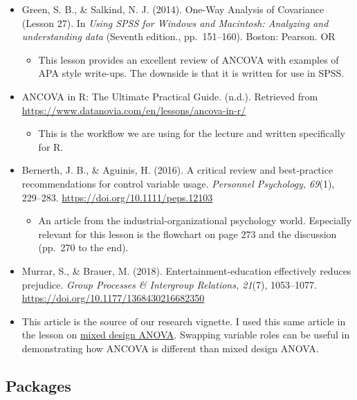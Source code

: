 \documentclass[
  11pt,
]{book}
\providecommand{\tightlist}{%
  \setlength{\itemsep}{0pt}\setlength{\parskip}{0pt}}
\begin{document}
\begin{itemize}
\tightlist
\item
  Green, S. B., \& Salkind, N. J. (2014). One-Way Analysis of Covariance (Lesson 27). In \emph{Using SPSS for Windows and Macintosh: Analyzing and understanding data} (Seventh edition., pp.~151--160). Boston: Pearson. OR

  \begin{itemize}
  \tightlist
  \item
    This lesson provides an excellent review of ANCOVA with examples of APA style write-ups. The downside is that it is written for use in SPSS.
  \end{itemize}
\item
  ANCOVA in R: The Ultimate Practical Guide. (n.d.). Retrieved from \url{https://www.datanovia.com/en/lessons/ancova-in-r/}

  \begin{itemize}
  \tightlist
  \item
    This is the workflow we are using for the lecture and written specifically for R.
  \end{itemize}
\item
  Bernerth, J. B., \& Aguinis, H. (2016). A critical review and best‐practice recommendations for control variable usage. \emph{Personnel Psychology, 69}(1), 229--283. \url{https://doi.org/10.1111/peps.12103}

  \begin{itemize}
  \tightlist
  \item
    An article from the industrial-organizational psychology world. Especially relevant for this lesson is the flowchart on page 273 and the discussion (pp.~270 to the end).
  \end{itemize}
\item
  Murrar, S., \& Brauer, M. (2018). Entertainment-education effectively reduces prejudice. \emph{Group Processes \& Intergroup Relations, 21}(7), 1053--1077. \url{https://doi.org/10.1177/1368430216682350}
\item
  This article is the source of our research vignette. I used this same article in the lesson on \protect\hyperlink{Mixed}{mixed design ANOVA}. Swapping variable roles can be useful in demonstrating how ANCOVA is different than mixed design ANOVA.
\end{itemize}

\hypertarget{packages-7}{%
\subsection{Packages}\label{packages-7}}
\end{document}
